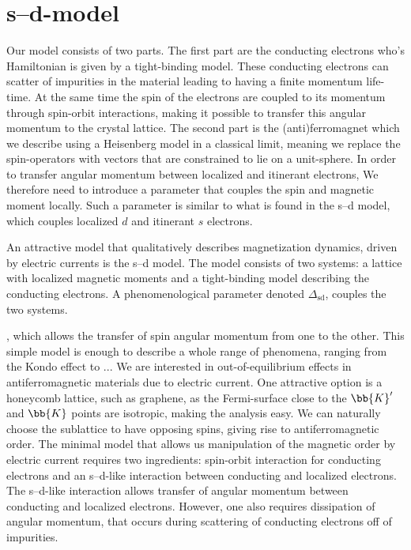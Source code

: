 \chapter{s--d-model}
Our model consists of two parts. The first part are the conducting electrons who's Hamiltonian is given by a tight-binding model. These conducting electrons can scatter of impurities in the material leading to having a finite momentum life-time. At the same time the spin of the electrons are coupled to its momentum through spin-orbit interactions, making it possible to transfer this angular momentum to the crystal lattice. The second part is the (anti)ferromagnet which we describe using a Heisenberg model in a classical limit, meaning we replace the spin-operators with vectors that are constrained to lie on a unit-sphere. In order to transfer angular momentum between localized and itinerant electrons, We therefore need to introduce a parameter that couples the spin and magnetic moment locally. Such a parameter is similar to what is found in the s--d model, which couples localized $d$ and itinerant $s$ electrons. 

An attractive model that qualitatively describes magnetization dynamics, driven by electric currents is the s--d model. The model consists of two systems: a lattice with localized magnetic moments and a tight-binding model describing the conducting electrons. A phenomenological parameter denoted $\Delta_\text{sd}$, couples the two systems. 

, which allows the transfer of spin angular momentum from one to the other. This simple model is enough to describe a whole range of phenomena, ranging from the Kondo effect to ... 
We are interested in out-of-equilibrium effects in antiferromagnetic materials due to electric current. One attractive option is a honeycomb lattice, such as graphene, as the Fermi-surface close to the $\bb{K}'$ and $\bb{K}$ points are isotropic, making the analysis easy. We can naturally choose the sublattice to have opposing spins, giving rise to antiferromagnetic order. The minimal model that allows us manipulation of the magnetic order by electric current requires two ingredients: spin-orbit interaction for conducting electrons and an s--d-like interaction between conducting and localized electrons. The s--d-like interaction allows transfer of angular momentum between conducting and localized electrons. However, one also requires dissipation of angular momentum, that occurs during scattering of conducting electrons off of impurities. 


